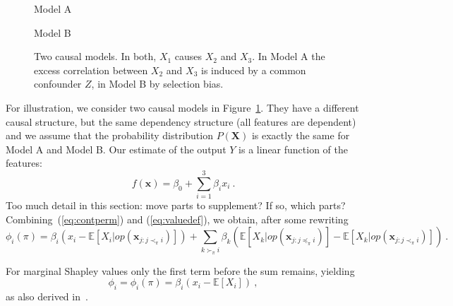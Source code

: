 \documentclass{article}
\newcommand{\vX}{\mathbf{X}}
\newcommand{\vx}{\mathbf{x}}
\newcommand{\expectation}{\mathbb{E}}
\newcommand{\contribution}{{\phi}}
\newcommand{\perm}{\pi}
\newcommand{\operator}{\mathit{op}}
\newcommand{\svop}[1]{\operator(\vx_{#1})}
\newcommand{\comment}[1]{{\color{red} #1}}
\begin{document}
\begin{figure}
	\begin{minipage}[t]{0.45\textwidth}
		\centering
		Model A\\[1em]	
	\end{minipage}
	\hfill
	\begin{minipage}[t]{0.45\textwidth}
		\centering
		Model B\\[1em]
	\end{minipage}
	\caption{Two causal models. In both, $X_1$ causes $X_2$ and $X_3$. In Model A the excess correlation between $X_2$ and $X_3$ is induced by a common confounder $Z$, in Model B by selection bias.}
	\label{fig:linmodel}
\end{figure}

For illustration, we consider two causal models in Figure~\ref{fig:linmodel}. They have a different causal structure, but the same dependency structure (all features are dependent) and we assume that the probability distribution $P(\vX)$ is exactly the same for Model A and Model B. Our estimate of the output $Y$ is a linear function of the features:
\[
f(\vx) = \beta_0 + \sum_{i=1}^3 \beta_i x_i \: .
\]
\comment{Too much detail in this section: move parts to supplement? If so, which parts?}
Combining~(\ref{eq:contperm}) and (\ref{eq:valuedef}), we obtain, after some rewriting
\[
\contribution_i(\perm) =
\beta_i \left(x_i - \expectation [X_i | \svop{j: j \prec_\perm i}]\right) + \sum_{k \succ_\perm i} \beta_k \left( \expectation [X_k | \svop{j: j \preceq_\perm i}] - \expectation [X_k | \svop{j: j \prec_\perm i}] \right) \: .
\]

For marginal Shapley values only the first term before the sum remains, yielding
\[
\contribution_i = \contribution_i(\perm) =
\beta_i (x_i - \expectation [X_i]) \: ,
\]
as also derived in~\cite{aas2019explaining}.
\end{document}
